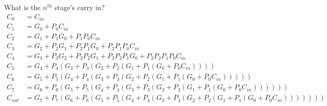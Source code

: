 \documentclass[a4paper, 11pt]{article}
\begin{document}
            What is the \(n^{th}\) stage's carry in?
            \scriptsize{
            \begin{align}
                C_0 &= C_{in}\\
                C_1 &= G_0+P_0C_{in}\\
                C_2 &= G_1+P_1G_0+P_1P_0C_{in}\\
                C_3 &= G_2+P_2G_1+P_2P_1G_0+P_2P_1P_0C_{in}\\
                C_4 &= G_3+P_3G_2+P_3P_2G_1+P_3P_2P_1G_0+P_3P_2P_1P_0C_{in}\\
                C_5 &= G_4+P_4(G_3+P_3(G_2+P_2(G_1+P_1(G_0+P_0C_{in}))))\\
                C_6 &= G_5+P_5(G_4+P_4(G_3+P_3(G_2+P_2(G_1+P_1(G_0+P_0C_{in})))))\\
                C_7 &= G_6+P_6(G_5+P_5(G_4+P_4(G_3+P_3(G_2+P_2(G_1+P_1(G_0+P_0C_{in}))))))\\
                C_{out} &= G_7+P_7(G_6+P_6(G_5+P_5(G_4+P_4(G_3+P_3(G_2+P_2(G_1+P_1(G_0+P_0C_{in})))))))
            \end{align}
            }\normalsize
\end{document}
